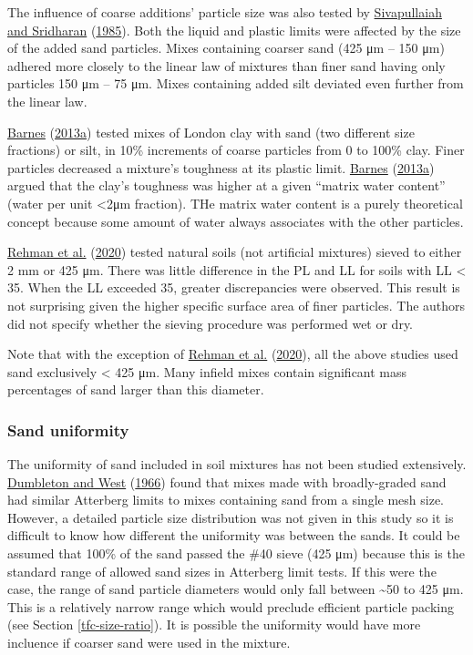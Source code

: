 \documentclass[
  letterpaper,
  openany]{book}
\begin{document}
The influence of coarse additions' particle size was also tested by \protect\hyperlink{ref-Sivapullaiah1985}{Sivapullaiah and Sridharan} (\protect\hyperlink{ref-Sivapullaiah1985}{1985}).
Both the liquid and plastic limits were affected by the size of the added sand particles.
Mixes containing coarser sand (425 μm -- 150 μm) adhered more closely to the linear law of mixtures than finer sand having only particles 150 μm -- 75 μm.
Mixes containing added silt deviated even further from the linear law.

\protect\hyperlink{ref-Barnes2013}{Barnes} (\protect\hyperlink{ref-Barnes2013}{2013a}) tested mixes of London clay with sand (two different size fractions) or silt, in 10\% increments of coarse particles from 0 to 100\% clay. Finer particles decreased a mixture's toughness at its plastic limit. \protect\hyperlink{ref-Barnes2013}{Barnes} (\protect\hyperlink{ref-Barnes2013}{2013a}) argued that the clay's toughness was higher at a given ``matrix water content'' (water per unit \textless2μm fraction).
THe matrix water content is a purely theoretical concept because some amount of water always associates with the other particles.

\protect\hyperlink{ref-Rehman2020}{Rehman et al.} (\protect\hyperlink{ref-Rehman2020}{2020}) tested natural soils (not artificial mixtures) sieved to either 2 mm or 425 μm.
There was little difference in the PL and LL for soils with LL \textless{} 35.
When the LL exceeded 35, greater discrepancies were observed.
This result is not surprising given the higher specific surface area of finer particles.
The authors did not specify whether the sieving procedure was performed wet or dry.

Note that with the exception of \protect\hyperlink{ref-Rehman2020}{Rehman et al.} (\protect\hyperlink{ref-Rehman2020}{2020}), all the above studies used sand exclusively \textless{} 425 μm.
Many infield mixes contain significant mass percentages of sand larger than this diameter.

\hypertarget{sand-uniformity}{%
\subsubsection{Sand uniformity}\label{sand-uniformity}}

The uniformity of sand included in soil mixtures has not been studied extensively.
\protect\hyperlink{ref-Dumbleton1966b}{Dumbleton and West} (\protect\hyperlink{ref-Dumbleton1966b}{1966}) found that mixes made with broadly-graded sand had similar Atterberg limits to mixes containing sand from a single mesh size.
However, a detailed particle size distribution was not given in this study so it is difficult to know how different the uniformity was between the sands.
It could be assumed that 100\% of the sand passed the \#40 sieve (425 μm) because this is the standard range of allowed sand sizes in Atterberg limit tests.
If this were the case, the range of sand particle diameters would only fall between \textasciitilde50 to 425 μm.
This is a relatively narrow range which would preclude efficient particle packing (see Section \ref{tfc-size-ratio}). It is possible the uniformity would have more incluence if coarser sand were used in the mixture.
\end{document}

